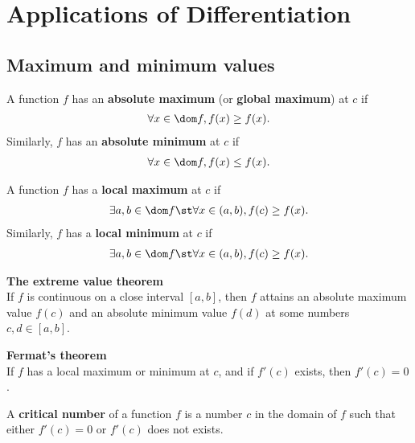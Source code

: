 \documentclass{article}
\begin{document}
\section{Applications of Differentiation}
\subsection{Maximum and minimum values}
\begin{definition}
    A function $f$ has an \textbf{absolute maximum} (or \textbf{global maximum}) at $c$ if
    \begin{align*}
        \forall x\in \dom f, f(x)\geq f(x).
    \end{align*} 
    Similarly, $f$ has an \textbf{absolute minimum} at $c$ if
    \begin{align*}
        \forall x\in \dom f, f(x)\leq f(x).
    \end{align*}
\end{definition}
\begin{definition}
    A function $f$ has a \textbf{local maximum} at $c$ if
    \begin{align*}
        \exists a,b\in \dom f \st \forall x\in (a,b), f(c)\geq f(x). 
    \end{align*}
    Similarly, $f$ has a \textbf{local minimum} at $c$ if
    \begin{align*}
        \exists a,b\in \dom f\st \forall x\in(a,b), f(c)\geq f(x).
    \end{align*}
\end{definition}
\begin{theorem}
    \textbf{The extreme value theorem}\\
    If $f$ is continuous on a close interval $[a,b]$, then $f$ attains an absolute maximum value $f(c)$ and an absolute minimum value $f(d)$ at some numbers $c,d\in[a,b]$.
\end{theorem}
\begin{theorem}
    \textbf{Fermat's theorem}\\
    If $f$ has a local maximum or minimum at $c$, and if $f'(c)$ exists, then $f'(c)=0$.
\end{theorem}
\begin{definition}
    A \textbf{critical number} of a function $f$ is a number $c$ in the domain of $f$ such that either $f'(c)=0$ or $f'(c)$ does not exists.
\end{definition}
\end{document}
